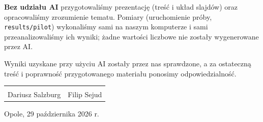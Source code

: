 \documentclass[11pt,a4paper]{article}
\begin{document}
\textbf{Bez udziału AI} przygotowaliśmy prezentację (treść i układ slajdów) oraz opracowaliśmy
zrozumienie tematu. Pomiary (uruchomienie próby, \texttt{results/pilot}) wykonaliśmy sami na naszym
komputerze i sami przeanalizowaliśmy ich wyniki; żadne wartości liczbowe nie zostały wygenerowane przez AI.

Wyniki uzyskane przy użyciu AI zostały przez nas sprawdzone, a za ostateczną treść i poprawność
przygotowanego materiału ponosimy odpowiedzialność.

\vspace{2.2em}
\noindent
\begin{tabular}{@{}p{}p{}@{}}
\dotfill & \dotfill \\
Dariusz Salzburg & Filip Sejud \\
\end{tabular}

\vspace{1em}
{\small Opole, 29 października 2026 r.}
\end{document}
